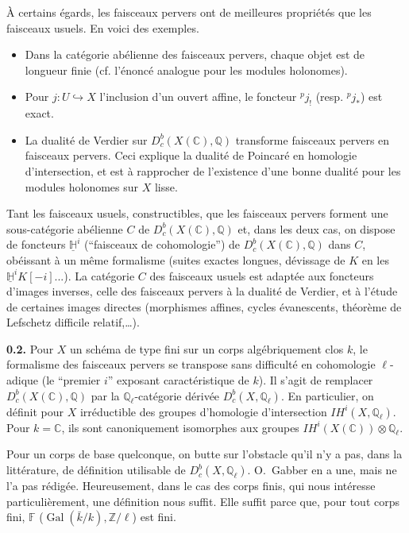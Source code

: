 \documentclass[12pt,a4paper]{article}
\theoremstyle{plain}
\theoremstyle{definition}
\theoremstyle{remark}
\DeclareMathOperator{\Gal}{Gal}
\newcommand{\IH}{\mathit{IH}}
\newcommand{\HH}{\mathbb{H}}
\newcommand{\CC}{\mathbb{C}}
\newcommand{\QQ}{\mathbb{Q}}
\newcommand{\ZZ}{\mathbb{Z}}
\newcommand{\FF}{\mathbb{F}}
\begin{document}
À certains égards, les faisceaux pervers ont de meilleures propriétés que les faisceaux usuels. En voici des exemples.

\begin{itemize}
\item Dans la catégorie abélienne des faisceaux pervers, chaque objet est de longueur finie (cf. l'énoncé analogue pour les modules holonomes).
\item Pour $j : U \hookrightarrow X$ l'inclusion d'un ouvert affine, le foncteur ${}^{p}j_{!}$ (resp. ${}^{p}j_{*}$) est exact.
\item La dualité de Verdier sur $D^{b}_{c}(X(\CC), \QQ)$ transforme faisceaux pervers en faisceaux pervers. Ceci explique la dualité de Poincaré en homologie d'intersection, et est à rapprocher de l'existence d'une bonne dualité pour les modules holonomes sur $X$ lisse.
\end{itemize}

Tant les faisceaux usuels, constructibles, que les faisceaux pervers forment une sous-catégorie abélienne $C$ de $D^{b}_{c}(X(\CC), \QQ)$ et, dans les deux cas, on dispose de foncteurs $\underline{\HH}^{i}$ (``faisceaux de cohomologie'') de $D^{b}_{c}(X(\CC), \QQ)$ dans $C$, obéissant à un même formalisme (suites exactes longues, dévissage de $K$ en les $\underline{\HH}^{i}K[-i]$...). La catégorie $C$ des faisceaux usuels est adaptée aux foncteurs d'images inverses, celle des faisceaux pervers à la dualité de Verdier, et à l'étude de certaines images directes (morphismes affines, cycles évanescents, théorème de Lefschetz difficile relatif,\ldots).

\medskip

\noindent
\textbf{0.2.} Pour $X$ un schéma de type fini sur un corps algébriquement clos $k$, le formalisme des faisceaux pervers se transpose sans difficulté en cohomologie $\ell$-adique (le ``premier $i$'' exposant caractéristique de $k$). Il s'agit de remplacer $D^{b}_{c}(X(\CC), \QQ)$ par la $\QQ_{\ell}$-catégorie dérivée $D^{b}_{c}(X, \QQ_{\ell})$. En particulier, on définit pour $X$ irréductible des groupes d'homologie d'intersection $\IH^{i}(X, \QQ_{\ell})$. Pour $k = \CC$, ils sont canoniquement isomorphes aux groupes $\IH^{i}(X(\CC)) \otimes \QQ_{\ell}$.

Pour un corps de base quelconque, on butte sur l'obstacle qu'il n'y a pas, dans la littérature, de définition utilisable de $D^{b}_{c}(X, \QQ_{\ell})$. O.~Gabber en a une, mais ne l'a pas rédigée. Heureusement, dans le cas des corps finis, qui nous intéresse particulièrement, une définition nous suffit. Elle suffit parce que, pour tout corps fini, $\FF$ ($\Gal(\bar{k}/k), \ZZ/\ell$) est fini.
\end{document}
